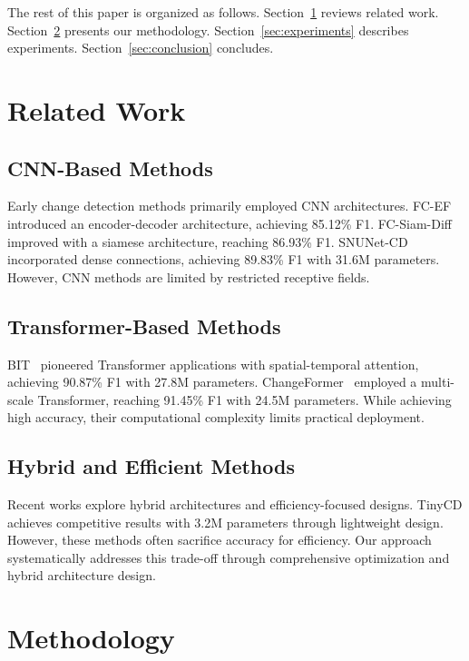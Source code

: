 \documentclass{IEEEtran}
\begin{document}
The rest of this paper is organized as follows. Section~\ref{sec:related} reviews related work. Section~\ref{sec:method} presents our methodology. Section~\ref{sec:experiments} describes experiments. Section~\ref{sec:conclusion} concludes.

\section{Related Work}
\label{sec:related}

\subsection{CNN-Based Methods}

Early change detection methods primarily employed CNN architectures. FC-EF~\cite{daudt2018fully} introduced an encoder-decoder architecture, achieving 85.12\% F1. FC-Siam-Diff~\cite{daudt2018semantic} improved with a siamese architecture, reaching 86.93\% F1. SNUNet-CD~\cite{fang2021snunet} incorporated dense connections, achieving 89.83\% F1 with 31.6M parameters. However, CNN methods are limited by restricted receptive fields.

\subsection{Transformer-Based Methods}

BIT~\cite{chen2021beat} pioneered Transformer applications with spatial-temporal attention, achieving 90.87\% F1 with 27.8M parameters. ChangeFormer~\cite{mondal2022changeformer} employed a multi-scale Transformer, reaching 91.45\% F1 with 24.5M parameters. While achieving high accuracy, their computational complexity limits practical deployment.

\subsection{Hybrid and Efficient Methods}

Recent works explore hybrid architectures and efficiency-focused designs. TinyCD achieves competitive results with 3.2M parameters through lightweight design. However, these methods often sacrifice accuracy for efficiency. Our approach systematically addresses this trade-off through comprehensive optimization and hybrid architecture design.

\section{Methodology}
\label{sec:method}
\end{document}
